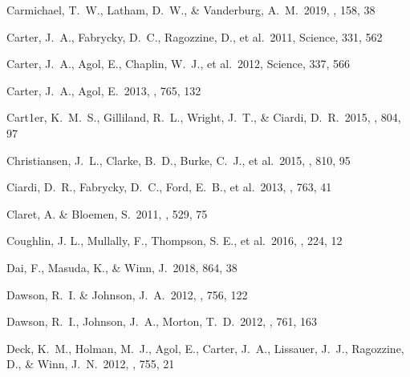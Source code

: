 \documentclass{aastex62}
\begin{document}
\begin{thebibliography}{}
Carmichael, T.~W., Latham, D.~W., \& Vanderburg, A.~M.~2019, \aj, 158, 38

 Carter, J.~A., Fabrycky, D.~C., Ragozzine, D., et al.~2011, Science, 331, 562

 Carter, J.~A., Agol, E., Chaplin, W.~J., et al.~2012, Science, 337, 566

 Carter, J.~A., Agol, E.~2013, \apj, 765, 132

 Cart1er, K.~M.~S., Gilliland, R.~L.,  Wright, J.~T., \& Ciardi, D.~R.~2015, \apj, 804, 97


 Christiansen, J.~L., Clarke, B.~D., Burke, C.~J., et al.~2015, \apj, 810, 95

 Ciardi, D.~R., Fabrycky, D.~C., Ford, E.~B., et al.~2013, \apj, 763, 41 

 Claret, A. \& Bloemen, S.~2011, \aap, 529, 75


  Coughlin, J. L., Mullally, F., Thompson, S. E., et al.~2016, \apjs, 224, 12

 Dai, F., Masuda, K., \& Winn, J.~2018, 864, 38 

 Dawson, R.~I. \& Johnson, J.~A.\ 2012, \apj, 756, 122 %

 Dawson, R.~I.,  Johnson, J.~A., Morton, T.~D.~2012,  \apj, 761, 163

 Deck, K.~M., Holman, M.~J., Agol, E., Carter, J.~A., Lissauer, J.~J., Ragozzine, D., \& Winn, J.~N.~2012,  \apj, 755, 21




\end{thebibliography}
\end{document}
